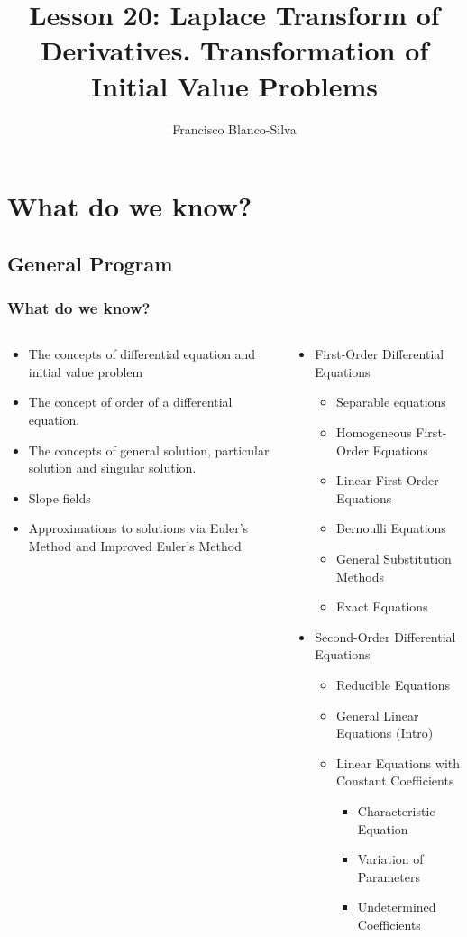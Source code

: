 \documentclass[9pt,xcolor=x11names,compress]{beamer}
\author[Francisco Blanco-Silva]{Francisco Blanco-Silva}
\institute[USC]{University of South Carolina}
\date{
\pgfdeclarelindenmayersystem{leaf}{
	\rule{F -> F--F+F-}
}
\begin{tikzpicture}[color=DeepSkyBlue4]
    \draw [l-system={leaf, axiom=FFF, order=7, step=0.75pt, angle=60 }]
    lindenmayer system; 
	\end{tikzpicture}
}
\title{Lesson 20: Laplace Transform of Derivatives.  Transformation of Initial Value Problems}
\begin{document}
\frame{\titlepage}

\section{What do we know?}
\subsection{General Program}

\begin{frame}\frametitle{What do we know?}
\begin{columns}[T]
\begin{column}{0.45\linewidth}
\begin{itemize}
\item The concepts of \alert{differential equation} and \alert{initial value problem}
\item The concept of \alert{order} of a differential equation.
\item The concepts of \alert{general solution}, \alert{particular solution} and \alert{singular solution}.
\item \alert{Slope fields}
\item Approximations to solutions via \alert{Euler's Method} and \alert{Improved Euler's Method}
\end{itemize} 
\end{column}
\begin{column}{0.55\linewidth}
\begin{itemize}
\item First-Order Differential Equations
\begin{itemize}
\item Separable equations 
\item Homogeneous First-Order Equations 
\item Linear First-Order Equations 
\item Bernoulli Equations 
\item General Substitution Methods
\item Exact Equations 
\end{itemize}
\item Second-Order Differential Equations
\begin{itemize}
	\item Reducible Equations
	\item General Linear Equations (Intro)
	\item Linear Equations with Constant Coefficients
	\begin{itemize}
		\item Characteristic Equation
		\item Variation of Parameters
		\item Undetermined Coefficients
	\end{itemize}
\end{itemize}
\end{itemize}
\end{column}
\end{columns}
\end{frame}
\end{document}
